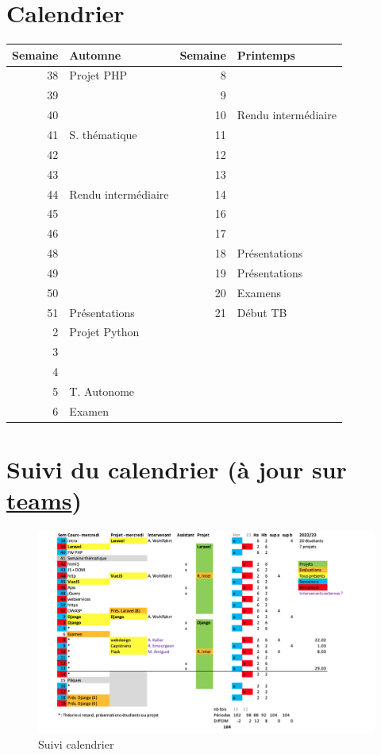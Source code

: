 \hypertarget{calendrier}{%
\section{Calendrier}\label{calendrier}}

\begin{longtable}[]{@{}rlrl@{}}
\toprule
Semaine & Automne & Semaine & Printemps\tabularnewline
\midrule
\endhead
38 & Projet PHP & 8 &\tabularnewline
39 & & 9 &\tabularnewline
40 & & 10 & Rendu intermédiaire\tabularnewline
41 & S. thématique & 11 &\tabularnewline
42 & & 12 &\tabularnewline
43 & & 13 &\tabularnewline
44 & Rendu intermédiaire & 14 &\tabularnewline
45 & & 16 &\tabularnewline
46 & & 17 &\tabularnewline
48 & & 18 & Présentations\tabularnewline
49 & & 19 & Présentations\tabularnewline
50 & & 20 & Examens\tabularnewline
51 & Présentations & 21 & Début TB\tabularnewline
2 & Projet Python & &\tabularnewline
3 & & &\tabularnewline
4 & & &\tabularnewline
5 & T. Autonome & &\tabularnewline
6 & Examen & &\tabularnewline
\bottomrule
\end{longtable}

\hypertarget{suivi-du-calendrier-uxe0-jour-sur-teamsteams}{%
\section{\texorpdfstring{Suivi du calendrier (à jour sur
\href{https://teams.microsoft.com/l/team/19\%3ahGPvEcXl8HCohGre1MLq7AQ4qPWNkY_JqMTTPMPLM-I1\%40thread.tacv2/conversations?groupId=cadc33cc-9fc8-49d7-b951-aa26d534e15f\&tenantId=5b3b7d7d-e119-4d05-9022-f775f2e48e96}{teams})}{Suivi du calendrier (à jour sur teams)}}\label{suivi-du-calendrier-uxe0-jour-sur-teamsteams}}

\begin{figure}
\centering
\includegraphics{src/img/DW2223.png}
\caption{Suivi calendrier}
\end{figure}

